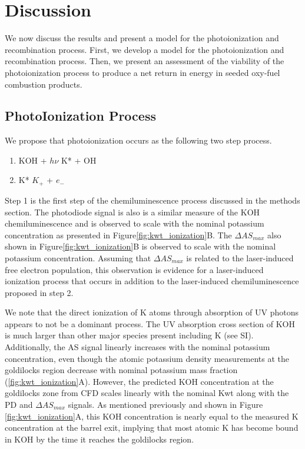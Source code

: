 \section{Discussion}

We now discuss the results and present a model for the photoionization and recombination process. First, we develop a model for the photoionization and recombination process. Then, we present an assessment of the viability of the photoionization process to produce a net return in energy in seeded oxy-fuel combustion products.

\subsection{PhotoIonization Process}

We propose that photoionization occurs as the following two step process. 

\begin{enumerate}
\item KOH + $h\nu$ \rightarrow K* + OH
\item K* \rightarrow $K_+$ + $e_-$
\end{enumerate}



Step 1 is the first step of the chemiluminescence process discussed in the methods section. The photodiode signal is also is a similar measure of the KOH chemiluminescence and is observed to scale with the nominal potassium concentration as presented in Figure\ref{fig:kwt_ionization}B. The $\Delta AS_{max}$ also shown in Figure\ref{fig:kwt_ionization}B is observed to scale with the nominal potassium concentration. Assuming that $\Delta AS_{max}$ is related to the laser-induced free electron population, this observation is evidence for a laser-induced ionization process that occurs in addition to the laser-induced chemiluminescence proposed in step 2. 


We note that the direct ionization of K atoms through absorption of UV photons appears to not be a dominant process. The UV absorption cross section of KOH is much larger than other major species present including K (see SI). Additionally, the AS signal linearly increases with the nominal potassium concentration, even though the atomic potassium density measurements at the goldilocks region decrease with nominal potassium mass fraction (\ref{fig:kwt_ionization}A). However, the predicted KOH concentration at the goldilocks zone from CFD scales linearly with the nominal Kwt along with the PD and $\Delta AS_{max}$ signals. As mentioned previously and shown in Figure \ref{fig:kwt_ionization}A, this KOH concentration is nearly equal to the measured K concentration at the barrel exit, implying that most atomic K has become bound in KOH by the time it reaches the goldilocks region.  

